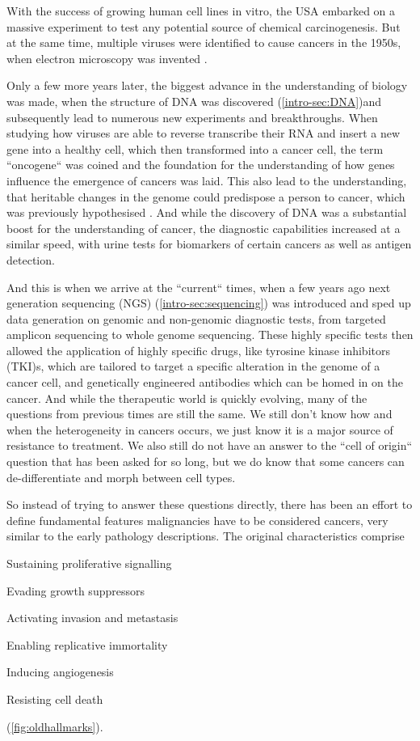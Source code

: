 With the success of growing human cell lines in vitro, the USA embarked on a massive experiment to test any potential source of chemical carcinogenesis. But at the same time, multiple viruses were identified to cause cancers in the 1950s, when electron microscopy was invented \cite{Claude1947}.

Only a few more years later, the biggest advance in the understanding of biology was made, when the structure of DNA was discovered \cite{Watson1953} (\autoref{intro-sec:DNA})and subsequently lead to numerous new experiments and breakthroughs. When studying how viruses are able to reverse transcribe their RNA and insert a new gene into a healthy cell, which then transformed into a cancer cell, the term ``oncogene`` was coined\cite{Huebner1969,Baltimore1970,Temin1970} and the foundation for the understanding of how genes influence the emergence of cancers was laid. This also lead to the understanding, that heritable changes in the genome could predispose a person to cancer, which was previously hypothesised \cite{Li1969}. And while the discovery of DNA was a substantial boost for the understanding of cancer, the diagnostic capabilities increased at a similar speed, with urine tests for biomarkers of certain cancers as well as antigen detection.

And this is when we arrive at the ``current`` times, when a few years ago next generation sequencing (NGS) (\autoref{intro-sec:sequencing}) was introduced and sped up data generation on genomic and non-genomic diagnostic tests, from targeted amplicon sequencing to whole genome sequencing. These highly specific tests then allowed the application of highly specific drugs, like tyrosine kinase inhibitors (TKI)s, which are tailored to target a specific alteration in the genome of a cancer cell, and genetically engineered antibodies which can be homed in on the cancer. And while the therapeutic world is quickly evolving, many of the questions from previous times are still the same. We still don't know how and when the heterogeneity in cancers occurs, we just know it is a major source of resistance to treatment. We also still do not have an answer to the ``cell of origin`` question that has been asked for so long, but we do know that some cancers can de-differentiate and morph between cell types.

So instead of trying to answer these questions directly, there has been an effort to define fundamental features malignancies have to be considered cancers, very similar to the early pathology descriptions.  The original characteristics comprise 
\begin{enumerate*}
	\item Sustaining proliferative signalling
	\item Evading growth suppressors
	\item Activating invasion and metastasis
	\item Enabling replicative immortality
	\item Inducing angiogenesis
	\item Resisting cell death
\end{enumerate*} (\autoref{fig:oldhallmarks}). 


